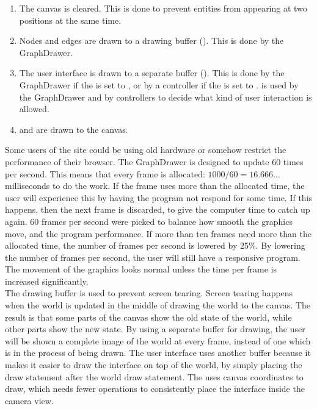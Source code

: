 \begin{enumerate}
    \item The canvas is cleared. This is done to prevent entities from appearing at two positions at the same time.
    \item Nodes and edges are drawn to a drawing buffer (). This is done by the GraphDrawer.
    \item The user interface is drawn to a separate buffer (). This is done by the GraphDrawer if the  is set to , or by a controller if the  is set to .  is used by the GraphDrawer and by controllers to decide what kind of user interaction is allowed.
    \item {} and  are drawn to the canvas.
\end{enumerate}
Some users of the site could be using old hardware or somehow restrict the performance of their browser. The GraphDrawer is designed to update 60 times per second. This means that every frame is allocated: $ 1000 / 60 = 16.666... $ milliseconds to do the work. If the frame uses more than the allocated time, the user will experience this by having the program not respond for some time. If this happens, then the next frame is discarded, to give the computer time to catch up again. 60 frames per second were picked to balance how smooth the graphics move, and the program performance. If more than ten frames need more than the allocated time, the number of frames per second is lowered by 25\%. By lowering the number of frames per second, the user will still have a responsive program. The movement of the graphics looks normal unless the time per frame is increased significantly.
\\[11pt]
The drawing buffer is used to prevent screen tearing. Screen tearing happens when the world is updated in the middle of drawing the world to the canvas. The result is that some parts of the canvas show the old state of the world, while other parts show the new state. By using a separate buffer for drawing, the user will be shown a complete image of the world at every frame, instead of one which is in the process of being drawn. The user interface uses another buffer because it makes it easier to draw the interface on top of the world, by simply placing the draw statement after the world draw statement. The  uses canvas coordinates to draw, which needs fewer operations to consistently place the interface inside the camera view.
